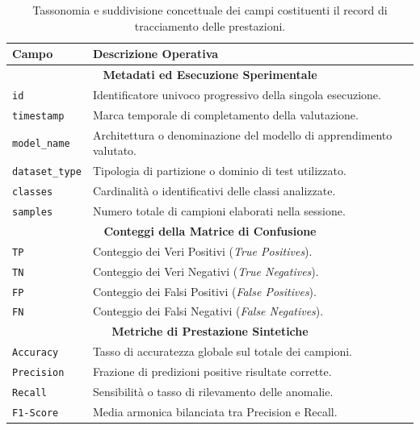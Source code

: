 \begin{table}[H]
    \centering
    \small
    \caption{Tassonomia e suddivisione concettuale dei campi costituenti il record di tracciamento delle prestazioni.}
    \label{tab:record_structure}
    \begin{tabularx}{\textwidth}{l >{\raggedright\arraybackslash}X}
        \toprule
        \textbf{Campo} & \textbf{Descrizione Operativa} \\
        \midrule
        \multicolumn{2}{c}{\textbf{Metadati ed Esecuzione Sperimentale}} \\
        \hline
        \texttt{id} & Identificatore univoco progressivo della singola esecuzione. \\
        \texttt{timestamp} & Marca temporale di completamento della valutazione. \\
        \texttt{model\_name} & Architettura o denominazione del modello di apprendimento valutato. \\
        \texttt{dataset\_type} & Tipologia di partizione o dominio di test utilizzato. \\
        \texttt{classes} & Cardinalità o identificativi delle classi analizzate. \\
        \texttt{samples} & Numero totale di campioni elaborati nella sessione. \\
        \hline
        \multicolumn{2}{c}{\textbf{Conteggi della Matrice di Confusione}} \\
        \hline
        \texttt{TP} & Conteggio dei Veri Positivi (\textit{True Positives}). \\
        \texttt{TN} & Conteggio dei Veri Negativi (\textit{True Negatives}). \\
        \texttt{FP} & Conteggio dei Falsi Positivi (\textit{False Positives}). \\
        \texttt{FN} & Conteggio dei Falsi Negativi (\textit{False Negatives}). \\
        \hline
        \multicolumn{2}{c}{\textbf{Metriche di Prestazione Sintetiche}} \\
        \hline
        \texttt{Accuracy} & Tasso di accuratezza globale sul totale dei campioni. \\
        \texttt{Precision} & Frazione di predizioni positive risultate corrette. \\
        \texttt{Recall} & Sensibilità o tasso di rilevamento delle anomalie. \\
        \texttt{F1-Score} & Media armonica bilanciata tra Precision e Recall. \\

\end{tabularx}
\end{table}
